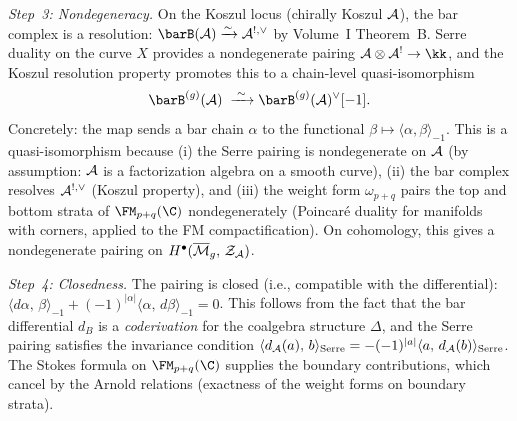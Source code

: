 \begin{construction}
\medskip
\noindent
\textit{Step~3: Nondegeneracy.}\enspace
On the Koszul locus (chirally Koszul $\mathcal{A}$), the bar complex
is a resolution: $\barB(\cA) \xrightarrow{\sim} \cA^{!,\vee}$
by Volume~I Theorem~B. Serre duality on the curve $X$ provides
a nondegenerate pairing $\cA \otimes \cA^{!} \to \kk$, and the
Koszul resolution property promotes this to a chain-level
quasi-isomorphism
\begin{equation}\label{eq:residue-pairing-nondeg}
\barB^{(g)}(\cA)
\;\xrightarrow{\;\sim\;}
\barB^{(g)}(\cA)^\vee[-1].
\end{equation}
Concretely: the map sends a bar chain $\alpha$ to the functional
$\beta \mapsto \langle \alpha,\beta\rangle_{-1}$. This is a
quasi-isomorphism because (i) the Serre pairing is
nondegenerate on $\mathcal{A}$ (by assumption: $\mathcal{A}$ is a
factorization algebra on a smooth curve), (ii) the bar complex
resolves $\mathcal{A}^{!,\vee}$ (Koszul property), and (iii) the weight
form $\omega_{p+q}$ pairs the top and bottom strata of
$\FM_{p+q}(\C)$ nondegenerately (Poincar\'{e} duality for manifolds
with corners, applied to the FM compactification). On
cohomology, this gives a nondegenerate pairing on
$H^\bullet(\overline{\mathcal{M}}_g,\,\mathcal{Z}_{\mathcal{A}})$.

\medskip
\noindent
\textit{Step~4: Closedness.}\enspace
The pairing is closed (i.e., compatible with the differential):
$\langle d\alpha,\,\beta\rangle_{-1}
+ (-1)^{|\alpha|}\langle\alpha,\,d\beta\rangle_{-1} = 0$.
This follows from the fact that the bar differential $d_B$ is a
\emph{coderivation} for the coalgebra structure $\Delta$, and the
Serre pairing satisfies the invariance condition
$\langle d_{\mathcal{A}}(a),\,b\rangle_{\mathrm{Serre}}
= -(-1)^{|a|}\langle a,\,d_{\mathcal{A}}(b)\rangle_{\mathrm{Serre}}$.
The Stokes formula on $\FM_{p+q}(\C)$ supplies the boundary
contributions, which cancel by the Arnold relations (exactness of
the weight forms on boundary strata).


\end{construction}
